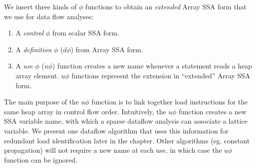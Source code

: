 We insert three kinds of $\phi$ functions 
to obtain an {\it extended}
Array SSA form that we use for data flow analyses:
\begin{enumerate}
\item 
A {\em control} $\phi$ from scalar SSA form.
\item
A {\em definition} $\phi$ ($d\phi$) from Array SSA form.
\item
A {\em use} $\phi$ ($u\phi$) function creates
a new name whenever a statement reads a heap array element.
$u\phi$ functions represent the extension
in ``extended'' Array SSA form.

\end{enumerate}
The main purpose of the $u\phi$ function is to link
together load instructions for the same heap array in control
flow order.   Intuitively, the $u\phi$ function creates a new
SSA variable name, with which a sparse dataflow analysis can
associate a lattice variable.  We present one dataflow algorithm that 
uses this information for redundant load identification later in 
the chapter.  Other algorithms (eg. constant propagation) will not require a 
new name at each use, in which case the $u\phi$ function can be
ignored.
